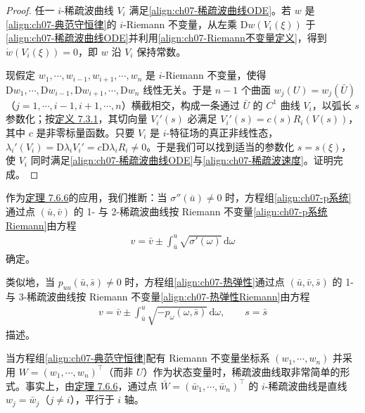 \documentclass[../../main.tex]{subfiles}
\begin{document}
\begin{proof}
任一 $i$-稀疏波曲线 $V_i$ 满足\eqref{align:ch07-稀疏波曲线ODE}。若 $w$ 是\eqref{align:ch07-典范守恒律}的 $i$-Riemann 不变量，从左乘 $\mathrm{D}w(V_i(\xi))$ 于\eqref{align:ch07-稀疏波曲线ODE}并利用\eqref{align:ch07-Riemann不变量定义}，得到 $\dot{w}(V_i(\xi))=0$，即 $w$ 沿 $V_i$ 保持常数。

现假定 $w_1,\cdots,w_{i-1},w_{i+1},\cdots,w_n$ 是 $i$-Riemann 不变量，使得 $\mathrm{D}w_1,\cdots,\mathrm{D}w_{i-1},\mathrm{D}w_{i+1},\cdots,\mathrm{D}w_n$ 线性无关。于是 $n-1$ 个曲面 $w_j(U)=w_j(\bar{U})$（$j=1,\cdots,i-1,i+1,\cdots,n$）横截相交，构成一条通过 $\bar{U}$ 的 $C^1$ 曲线 $V_i$，以弧长 $s$ 参数化；按\hyperref[definition:ch07-iRiemann不变量]{定义 7.3.1}，其切向量 $V_i'(s)$ 必满足 $V_i'(s)=c(s)R_i(V(s))$，其中 $c$ 是非零标量函数。只要 $V_i$ 是 $i$-特征场的真正非线性态，$\lambda_i'(V_i)=\mathrm{D}\lambda_i V_i'=c\mathrm{D}\lambda_i R_i\neq 0$。于是我们可以找到适当的参数化 $s=s(\xi)$，使 $V_i$ 同时满足\eqref{align:ch07-稀疏波曲线ODE}与\eqref{align:ch07-稀疏波速度}。证明完成。
\end{proof}

作为\hyperref[theorem:ch07-稀疏波曲线Riemann刻画]{定理 7.6.6}的应用，我们推断：当 $\sigma''(\bar{u})\neq 0$ 时，方程组\eqref{align:ch07-p系统}通过点 $(\bar{u},\bar{v})$ 的 1- 与 2-稀疏波曲线按 Riemann 不变量\eqref{align:ch07-p系统Riemann}由方程
\begin{align}
v=\bar{v}\pm\int_{\bar{u}}^u\sqrt{\sigma'(\omega)}\,\mathrm{d}\omega
\label{align:ch07-p系统稀疏波}
\end{align}
确定。

类似地，当 $p_{uu}(\bar{u},\bar{s})\neq 0$ 时，方程组\eqref{align:ch07-热弹性}通过点 $(\bar{u},\bar{v},\bar{s})$ 的 1- 与 3-稀疏波曲线按 Riemann 不变量\eqref{align:ch07-热弹性Riemann}由方程
\begin{align}
v=\bar{v}\pm\int_{\bar{u}}^u\sqrt{-p_\omega(\omega,\bar{s})}\,\mathrm{d}\omega,\qquad s=\bar{s}
\label{align:ch07-热弹性稀疏波}
\end{align}
描述。

当方程组\eqref{align:ch07-典范守恒律}配有 Riemann 不变量坐标系 $(w_1,\cdots,w_n)$ 并采用 $W=(w_1,\cdots,w_n)^\top$（而非 $U$）作为状态变量时，稀疏波曲线取非常简单的形式。事实上，由\hyperref[theorem:ch07-稀疏波曲线Riemann刻画]{定理 7.6.6}，通过点 $\bar{W}=(\bar{w}_1,\cdots,\bar{w}_n)^\top$ 的 $i$-稀疏波曲线是直线 $w_j=\bar{w}_j$（$j\neq i$），平行于 $i$ 轴。
\end{document}

